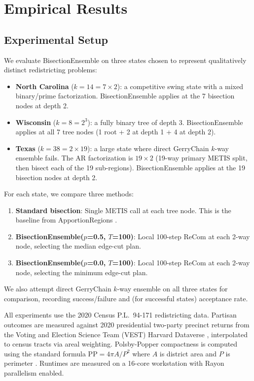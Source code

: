 \section{Empirical Results}
\label{sec:results}

\subsection{Experimental Setup}
\label{sec:results:setup}

We evaluate BisectionEnsemble on three states chosen to represent qualitatively
distinct redistricting problems:
\begin{itemize}
  \item \textbf{North Carolina} ($k=14 = 7 \times 2$): a competitive swing state
        with a mixed binary/prime factorization. BisectionEnsemble applies at the
        7 bisection nodes at depth 2.
  \item \textbf{Wisconsin} ($k=8 = 2^3$): a fully binary tree of depth 3.
        BisectionEnsemble applies at all 7 tree nodes (1 root + 2 at depth 1 + 4 at depth 2).
  \item \textbf{Texas} ($k=38 = 2 \times 19$): a large state where direct
        GerryChain $k$-way ensemble fails. The AR factorization is $19 \times 2$
        (19-way primary METIS split, then bisect each of the 19 sub-regions).
        BisectionEnsemble applies at the 19 bisection nodes at depth 2.
\end{itemize}

For each state, we compare three methods:
\begin{enumerate}
  \item \textbf{Standard bisection}: Single METIS call at each tree node.
        This is the baseline from ApportionRegions \citep{dellaLibera2026apportion}.
  \item \textbf{BisectionEnsemble($p$=0.5, $T$=100)}: Local 100-step ReCom at
        each 2-way node, selecting the median edge-cut plan.
  \item \textbf{BisectionEnsemble($p$=0.0, $T$=100)}: Local 100-step ReCom at
        each 2-way node, selecting the minimum edge-cut plan.
\end{enumerate}
We also attempt direct GerryChain $k$-way ensemble on all three states for
comparison, recording success/failure and (for successful states) acceptance rate.

All experiments use the 2020 Census P.L.~94-171 redistricting data.
Partisan outcomes are measured against 2020 presidential two-party precinct
returns from the Voting and Election Science Team (VEST) Harvard Dataverse
\citep{vest2020}, interpolated to census tracts via areal weighting.
Polsby-Popper compactness is computed using the standard formula
$\text{PP} = 4\pi A / P^2$ where $A$ is district area and $P$ is perimeter
\citep{polsby1991third}.
Runtimes are measured on a 16-core workstation with Rayon parallelism enabled.

